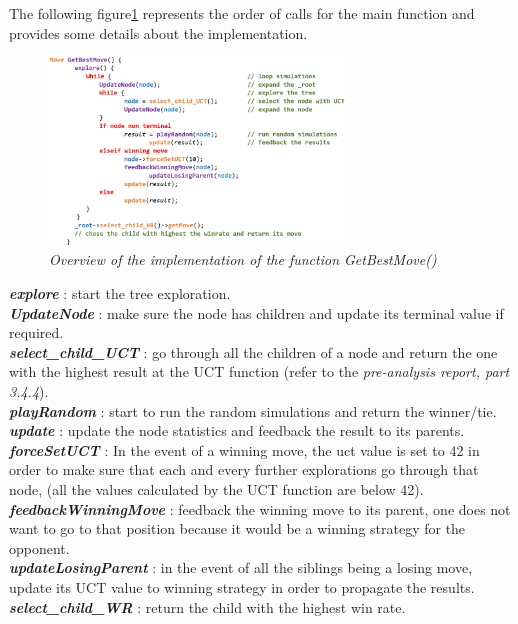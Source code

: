 The following figure\ref{fig:MCTSAlgorithm} represents the order of calls for the main function and provides some details about the implementation.
\begin{figure}[H]
\centerline{\includegraphics[width=0.7\textwidth]{Base_Algorithm/Img/Algorithm.png}}
\caption{\label{fig:MCTSAlgorithm}\textit{Overview of the implementation of the function GetBestMove()}}
\end{figure}
\noindent
\textit{\textbf{explore}} : start the tree exploration.
\medskip\\
\textit{\textbf{UpdateNode}} : make sure the node has children and update its terminal value if required.
\medskip\\
\textit{\textbf{select\_child\_UCT}} : go through all the children of a node and return the one with the highest result at the UCT function (refer to the \textit{pre-analysis report, part 3.4.4}).
\medskip\\
\textit{\textbf{playRandom}} : start to run the random simulations and return the winner/tie.
\medskip\\
\textit{\textbf{update}} : update the node statistics and feedback the result to its parents.
\medskip\\
\textit{\textbf{forceSetUCT}} : In the event of a winning move, the uct value is set to 42 in order to make sure that each and every further explorations go through that node, (all the values calculated by the UCT function are below 42).
\medskip\\
\textit{\textbf{feedbackWinningMove}} : feedback the winning move to its parent, one does not want to go to that position because it would be a winning strategy for the opponent.
\medskip\\
\textit{\textbf{updateLosingParent}} : in the event of all the siblings being a losing move, update its UCT value to winning strategy in order to propagate the results.
\medskip\\
\textit{\textbf{select\_child\_WR}} : return the child with the highest win rate.\\
